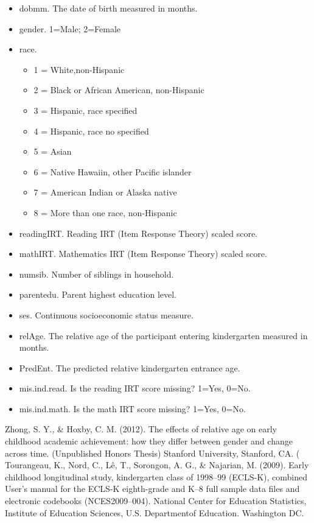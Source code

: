 \documentclass[a4paper]{book}
\begin{document}
%
\begin{Details}\relax
\begin{itemize}

\item dobmm. The date of birth measured in months.
\item gender. 1=Male; 2=Female
\item race.
\begin{itemize}

\item 1 = White,non-Hispanic
\item 2 = Black or African American, non-Hispanic
\item 3 = Hispanic, race specified
\item 4 = Hispanic, race no specified
\item 5 = Asian
\item 6 = Native Hawaiin, other Pacific islander
\item 7 = American Indian or Alaska native
\item 8 = More than one race, non-Hispanic

\end{itemize}

\item readingIRT. Reading IRT (Item Response Theory) scaled score.
\item mathIRT. Mathematics IRT (Item Response Theory) scaled score.
\item numsib. Number of siblings in household.
\item parentedu. Parent highest education level.
\item ses. Continuous socioeconomic status measure.
\item relAge. The relative age of the participant entering kindergarten measured in months.
\item PredEnt. The predicted relative kindergarten entrance age.
\item mis.ind.read. Is the reading IRT score missing? 1=Yes, 0=No.
\item mis.ind.math. Is the math IRT score missing? 1=Yes, 0=No.

\end{itemize}

\end{Details}
%
\begin{References}\relax
Zhong, S. Y., \& Hoxby, C. M. (2012).
The effects of relative age on early childhood academic achievement:
how they differ between gender and change across time.
(Unpublished Honors Thesis) Stanford University, Stanford, CA.
(
Tourangeau, K., Nord, C., Lê, T., Sorongon, A. G., \& Najarian, M. (2009).
Early childhood longitudinal study, kindergarten class of 1998–99 (ECLS-K),
combined User's manual for the ECLS-K eighth-grade and K–8 full sample data files
and electronic codebooks (NCES2009–004).
National Center for Education Statistics, Institute of Education Sciences,
U.S. Departmentof Education. Washington DC.
\end{References}
\end{document}
